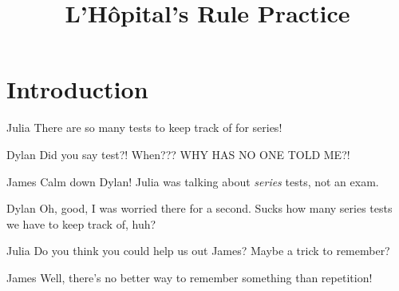 \documentclass{ximera}
\title{L'H\^{o}pital's Rule Practice}
\theoremstyle{definition}
\begin{document}
\section{Introduction}
\begin{dialogue}
\item[Julia] There are so many tests to keep track of for series!
\item[Dylan] Did you say test?! When??? WHY HAS NO ONE TOLD ME?!
\item[James] Calm down Dylan! Julia was talking about \textit{series} tests, not an exam.
\item[Dylan] Oh, good, I was worried there for a second. Sucks how many series tests we have to keep track of, huh?
\item[Julia] Do you think you could help us out James? Maybe a trick to remember?
\item[James] Well, there's no better way to remember something than repetition!
\end{dialogue}
\end{document}
